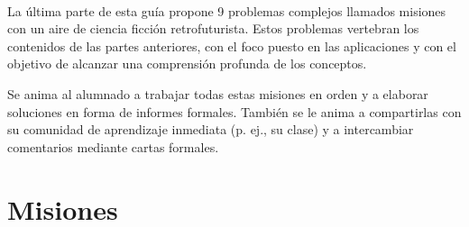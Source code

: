 \ \\[-9cm]
La última parte de esta guía propone 9 problemas complejos llamados misiones
con un aire de ciencia ficción retrofuturista. Estos problemas vertebran los contenidos de las partes
anteriores, con el foco puesto en las aplicaciones y con el objetivo de alcanzar una comprensión profunda de los conceptos.

Se anima al alumnado a trabajar todas estas misiones en orden y a elaborar soluciones
en forma de informes formales. También se le anima a compartirlas con su
comunidad de aprendizaje inmediata (p. ej., su clase) y a intercambiar comentarios
mediante cartas formales.


\chapter{Misiones}

